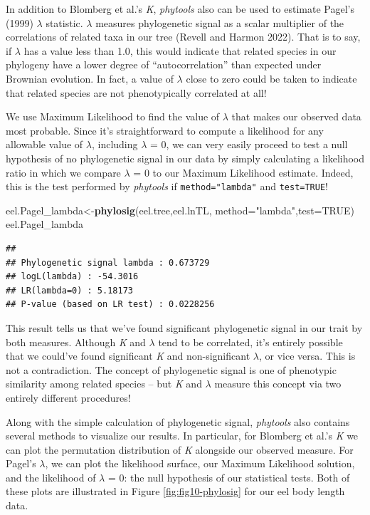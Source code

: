\documentclass[fleqn,10pt,lineno]{wlpeerj} %
\newenvironment{Shaded}{\begin{snugshade}}{\end{snugshade}}
\newcommand{\AttributeTok}[1]{\textcolor[rgb]{0.13,0.29,0.53}{#1}}
\newcommand{\ConstantTok}[1]{\textcolor[rgb]{0.56,0.35,0.01}{#1}}
\newcommand{\FunctionTok}[1]{\textcolor[rgb]{0.13,0.29,0.53}{\textbf{#1}}}
\newcommand{\NormalTok}[1]{#1}
\newcommand{\OtherTok}[1]{\textcolor[rgb]{0.56,0.35,0.01}{#1}}
\newcommand{\StringTok}[1]{\textcolor[rgb]{0.31,0.60,0.02}{#1}}
\begin{document}
In addition to Blomberg et al.'s \emph{K}, \emph{phytools} also can be used to estimate Pagel's (1999) \(\lambda\) statistic. \(\lambda\) measures phylogenetic signal as a scalar multiplier of the correlations of related taxa in our tree (Revell and Harmon 2022). That is to say, if \(\lambda\) has a value less than 1.0, this would indicate that related species in our phylogeny have a lower degree of ``autocorrelation'' than expected under Brownian evolution. In fact, a value of \(\lambda\) close to zero could be taken to indicate that related species are not phenotypically correlated at all!

We use Maximum Likelihood to find the value of \(\lambda\) that makes our observed data most probable. Since it's straightforward to compute a likelihood for any allowable value of \(\lambda\), including \(\lambda\) = 0, we can very easily proceed to test a null hypothesis of no phylogenetic signal in our data by simply calculating a likelihood ratio in which we compare \(\lambda\) = 0 to our Maximum Likelihood estimate. Indeed, this is the test performed by \emph{phytools} if \texttt{method="lambda"} and \texttt{test=TRUE}!

\begin{Shaded}
\begin{Highlighting}[]
\NormalTok{eel.Pagel\_lambda}\OtherTok{\textless{}{-}}\FunctionTok{phylosig}\NormalTok{(eel.tree,eel.lnTL,}
  \AttributeTok{method=}\StringTok{"lambda"}\NormalTok{,}\AttributeTok{test=}\ConstantTok{TRUE}\NormalTok{)}
\NormalTok{eel.Pagel\_lambda}
\end{Highlighting}
\end{Shaded}

\begin{verbatim}
## 
## Phylogenetic signal lambda : 0.673729 
## logL(lambda) : -54.3016 
## LR(lambda=0) : 5.18173 
## P-value (based on LR test) : 0.0228256
\end{verbatim}

This result tells us that we've found significant phylogenetic signal in our trait by both measures. Although \emph{K} and \(\lambda\) tend to be correlated, it's entirely possible that we could've found significant \emph{K} and non-significant \(\lambda\), or vice versa. This is not a contradiction. The concept of phylogenetic signal is one of phenotypic similarity among related species -- but \emph{K} and \(\lambda\) measure this concept via two entirely different procedures!

Along with the simple calculation of phylogenetic signal, \emph{phytools} also contains several methods to visualize our results. In particular, for Blomberg et al.'s \emph{K} we can plot the permutation distribution of \emph{K} alongside our observed measure. For Pagel's \(\lambda\), we can plot the likelihood surface, our Maximum Likelihood solution, and the likelihood of \(\lambda\) = 0: the null hypothesis of our statistical tests. Both of these plots are illustrated in Figure \ref{fig:fig10-phylosig} for our eel body length data.
\end{document}
